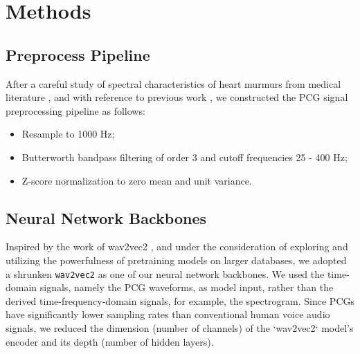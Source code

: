 \section{Methods}
\label{sec:methods}




\subsection{Preprocess Pipeline}
\label{subsec:preproc}

After a careful study of spectral characteristics of heart murmurs from medical literature \cite{Noponen_2007}, and with reference to previous work \cite{Schmidt_2010}, we constructed the PCG signal preprocessing pipeline as follows:
\begin{itemize}
    \item Resample to 1000 Hz;
    \item Butterworth bandpass filtering of order 3 and cutoff frequencies 25 - 400 Hz;
    \item Z-score normalization to zero mean and unit variance.
\end{itemize}

\subsection{Neural Network Backbones}
\label{subsec:backbone}

Inspired by the work of wav2vec2 \cite{baevski2020wav2vec}, and under the consideration of exploring and utilizing the powerfulness of pretraining models on larger databases, we adopted a shrunken \texttt{wav2vec2} as one of our neural network backbones. We used the time-domain signals, namely the PCG waveforms, as model input, rather than the derived time-frequency-domain signals, for example, the spectrogram. Since PCGs have significantly lower sampling rates than conventional human voice audio signals, we reduced the dimension (number of channels) of the `wav2vec2` model's encoder and its depth (number of hidden layers).


